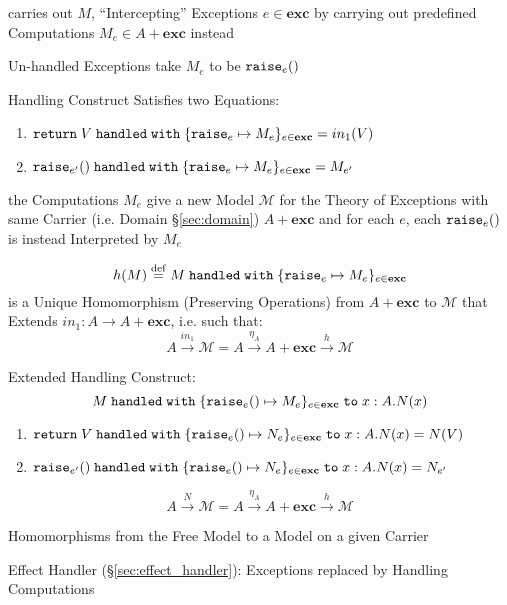carries out $M$, ``Intercepting'' Exceptions $e \in \mathbf{exc}$ by
carrying out predefined Computations $M_e \in A + \mathbf{exc}$
instead

Un-handled Exceptions take $M_e$ to be $\mathtt{raise}_e()$

Handling Construct Satisfies two Equations:
\begin{enumerate}
  \item $\mathtt{return}\; V \;\mathtt{handled\;with}\;
    \{\mathtt{raise}_e \mapsto M_e\}_{e \in \mathbf{exc}}
    = in_1(V)$
  \item $\mathtt{raise}_{e'}() \;\mathtt{handled\;with}\;
    \{\mathtt{raise}_e \mapsto M_e\}_{e \in \mathbf{exc}}
    = M_{e'}$
\end{enumerate}

the Computations $M_e$ give a new Model $\mathcal{M}$ for the Theory
of Exceptions with same Carrier (i.e. Domain \S\ref{sec:domain}) $A +
\mathbf{exc}$ and for each $e$, each $\mathtt{raise}_e ()$ is instead
Interpreted by $M_e$

\[
  h(M) \stackrel{\mathrm{def}}= M \;\mathtt{handled\;with}\;
    \{\mathtt{raise}_e \mapsto M_e\}_{e \in \mathbf{exc}}
\]
is a Unique Homomorphism (Preserving Operations) from $A +
\mathbf{exc}$ to $\mathcal{M}$ that Extends $in_1 : A \rightarrow A +
\mathbf{exc}$, i.e. such that:
\[
  A \xrightarrow{in_1} \mathcal{M} =
    A \xrightarrow{\eta_A} A + \mathbf{exc} \xrightarrow{h} \mathcal{M}
\]

Extended Handling Construct:
\[
  M \;\mathtt{handled\;with}\;
    \{\mathtt{raise}_e() \mapsto M_e \}_{e\in\mathbf{exc}}
    \;\mathtt{to}\; x : A.N(x)
\]

\begin{enumerate}
  \item $\mathtt{return}\; V \;\mathtt{handled\;with}\;
    \{\mathtt{raise}_e() \mapsto N_e\}_{e \in \mathbf{exc}}
    \;\mathtt{to}\; x:A.N(x)
    = N(V)$
  \item $\mathtt{raise}_{e'}() \;\mathtt{handled\;with}\;
    \{\mathtt{raise}_e() \mapsto N_e\}_{e \in \mathbf{exc}}
    \;\mathtt{to}\; x:A.N(x)
    = N_{e'}$
\end{enumerate}
\[
  A \xrightarrow{N} \mathcal{M} =
    A \xrightarrow{\eta_A} A + \mathbf{exc} \xrightarrow{h} \mathcal{M}
\]

Homomorphisms from the Free Model to a Model on a given Carrier

Effect Handler (\S\ref{sec:effect_handler}): Exceptions replaced by
Handling Computations




